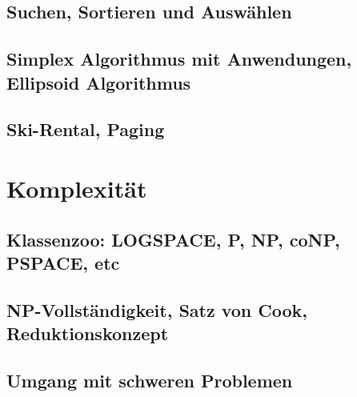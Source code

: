 \documentclass[a4paper,10pt]{scrbook}
\begin{document}
\section{Suchen, Sortieren und Auswählen}
\section{Simplex Algorithmus mit Anwendungen, Ellipsoid Algorithmus}
\section{Ski-Rental, Paging}
\chapter{Komplexität}
\section{Klassenzoo: LOGSPACE, P, NP, coNP, PSPACE, etc}
\section{NP-Vollständigkeit, Satz von Cook, Reduktionskonzept}
\section{Umgang mit schweren Problemen}
\end{document}
